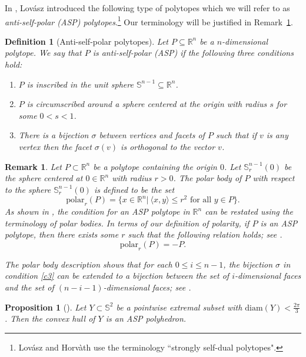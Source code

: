 \documentclass[12pt]{amsart}
\theoremstyle{plain}
\newtheorem{proposition}[theorem]{Proposition}
\newtheorem{remark}[theorem]{Remark}
\newtheorem{definition}[theorem]{Definition}
\newcommand{\R}{\mathbb{R}}
\newcommand{\Sp}{\mathbb{S}}
\newcommand{\diam}{\mathrm{diam}}
\numberwithin{equation}{section}
\begin{document}
In \cite{lovasz1983self}, Lov\'{a}sz introduced the following type of
polytopes which we will refer to as \emph{anti-self-polar (ASP)
  polytopes}.\footnote{Lov\'asz \cite{lovasz1983self} and
  Horv\`ath\cite{horvath2021strongly} use the terminology ``strongly
  self-dual polytopes".}  Our terminology will be justified in
Remark~\ref{rmk:polar_body_bijection}.

\begin{definition}[Anti-self-polar polytopes]\label{defn:asp}
Let $P\subseteq\R^n$ be a $n$-dimensional polytope.  We say that $P$
is \emph{anti-self-polar} (ASP) if the following three conditions
hold:
\begin{enumerate}
\item $P$ is inscribed in the unit sphere $\Sp^{n-1}\subseteq\R^n$.
\item $P$ is circumscribed around a sphere centered at the origin with
  radius $s$ for some $0<s<1$.
\item
\label{c3} 
There is a bijection $\sigma$ between vertices and facets of $P$ such
that if $v$ is any vertex then the facet $\sigma(v)$ is orthogonal to
the vector $v$.
\end{enumerate}
\end{definition}

\begin{remark}\label{rmk:polar_body_bijection}
Let $P\subset \R^n$ be a polytope containing the origin $0$.  Let
$\Sp^{n-1}_r(0)$ be the sphere centered at $0\in \R^n$ with radius
$r>0$.  The polar body of $P$ with respect to the sphere
$\Sp^{n-1}_r(0)$ is defined to be the set $$\mathrm{polar}_r(P)=\{x\in
\R^n |~\langle x, y\rangle \leq r^2 \text{ for all $y\in P$}\}.$$ As
shown in \cite{horvath2021strongly}, the condition for an ASP polytope
in $\R^n$ can be restated using the terminology of \emph{polar
  bodies}.  In terms of our definition of polarity, if $P$ is an ASP
polytope, then there exists some $r$ such that the following relation
holds; see \cite[Lemma~1]{horvath2021strongly}.
	$$\mathrm{polar}_r(P) = -P.$$

The polar body description shows that for each $0\leq i\leq n-1$, the
bijection $\sigma$ in condition \eqref{c3} can be extended to a
bijection between the set of $i$-dimensional faces and the set of
$(n-i-1)$-dimensional faces; see \cite[Lemma~2]{horvath2021strongly}.
\end{remark}




\begin{proposition}[{\cite[Remark after Theorem 1]{katz1989diameter}}]\label{prop:pointwise_extremal_self_dual_polytope}
Let $Y\subset\Sp^2$ be a pointwise extremal subset with
$\diam(Y)<\frac{2\pi}{3}$. Then the convex hull of $Y$ is an ASP polyhedron.
\end{proposition}
\end{document}
